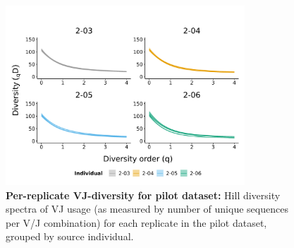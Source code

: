\begin{figure}
\centering
\includegraphics[width = 0.8\textwidth]{_Figures/png/pilot-vj-diversity-solo-spectra}
\caption{\textbf{Per-replicate VJ-diversity for pilot dataset:} Hill diversity spectra of VJ usage (as measured by number of unique sequences per V/J combination) for each replicate in the \igseq pilot dataset, grouped by source individual.}
\label{fig:igseq-pilot-clone-diversity-vj-spectra}
\end{figure} %